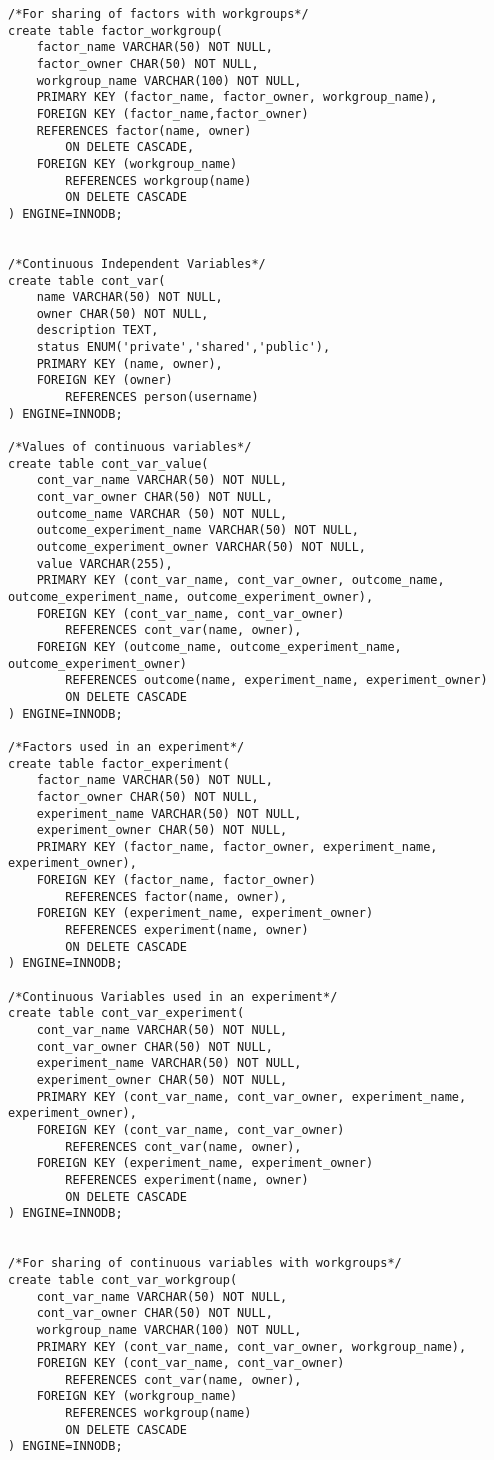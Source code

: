 \begin{tiny}
\begin{verbatim}
/*For sharing of factors with workgroups*/
create table factor_workgroup(
	factor_name VARCHAR(50) NOT NULL,
	factor_owner CHAR(50) NOT NULL,
	workgroup_name VARCHAR(100) NOT NULL,
	PRIMARY KEY (factor_name, factor_owner, workgroup_name),
	FOREIGN KEY (factor_name,factor_owner)
	REFERENCES factor(name, owner)
		ON DELETE CASCADE,
	FOREIGN KEY (workgroup_name)
		REFERENCES workgroup(name)
		ON DELETE CASCADE
) ENGINE=INNODB;	


/*Continuous Independent Variables*/
create table cont_var(
	name VARCHAR(50) NOT NULL,
	owner CHAR(50) NOT NULL,
	description TEXT,
	status ENUM('private','shared','public'),
	PRIMARY KEY (name, owner),
	FOREIGN KEY (owner)
		REFERENCES person(username)
) ENGINE=INNODB;

/*Values of continuous variables*/
create table cont_var_value(
	cont_var_name VARCHAR(50) NOT NULL,
	cont_var_owner CHAR(50) NOT NULL,
	outcome_name VARCHAR (50) NOT NULL,
	outcome_experiment_name VARCHAR(50) NOT NULL,
	outcome_experiment_owner VARCHAR(50) NOT NULL,
	value VARCHAR(255),
	PRIMARY KEY (cont_var_name, cont_var_owner, outcome_name, outcome_experiment_name, outcome_experiment_owner),
	FOREIGN KEY (cont_var_name, cont_var_owner)
		REFERENCES cont_var(name, owner),
	FOREIGN KEY (outcome_name, outcome_experiment_name, outcome_experiment_owner)
		REFERENCES outcome(name, experiment_name, experiment_owner)
		ON DELETE CASCADE
) ENGINE=INNODB;

/*Factors used in an experiment*/
create table factor_experiment(
	factor_name VARCHAR(50) NOT NULL,
	factor_owner CHAR(50) NOT NULL,
	experiment_name VARCHAR(50) NOT NULL,
	experiment_owner CHAR(50) NOT NULL,
	PRIMARY KEY (factor_name, factor_owner, experiment_name, experiment_owner),
	FOREIGN KEY (factor_name, factor_owner)
		REFERENCES factor(name, owner),
	FOREIGN KEY (experiment_name, experiment_owner)
		REFERENCES experiment(name, owner)
		ON DELETE CASCADE
) ENGINE=INNODB;

/*Continuous Variables used in an experiment*/
create table cont_var_experiment(
	cont_var_name VARCHAR(50) NOT NULL,
	cont_var_owner CHAR(50) NOT NULL,
	experiment_name VARCHAR(50) NOT NULL,
	experiment_owner CHAR(50) NOT NULL,
	PRIMARY KEY (cont_var_name, cont_var_owner, experiment_name, experiment_owner),
	FOREIGN KEY (cont_var_name, cont_var_owner)
		REFERENCES cont_var(name, owner),
	FOREIGN KEY (experiment_name, experiment_owner)
		REFERENCES experiment(name, owner)
		ON DELETE CASCADE
) ENGINE=INNODB;

	
/*For sharing of continuous variables with workgroups*/
create table cont_var_workgroup(
	cont_var_name VARCHAR(50) NOT NULL,
	cont_var_owner CHAR(50) NOT NULL,
	workgroup_name VARCHAR(100) NOT NULL,
	PRIMARY KEY (cont_var_name, cont_var_owner, workgroup_name),
	FOREIGN KEY (cont_var_name, cont_var_owner)
		REFERENCES cont_var(name, owner),
	FOREIGN KEY (workgroup_name) 
		REFERENCES workgroup(name)
		ON DELETE CASCADE  
) ENGINE=INNODB;	

\end{verbatim}
\end{tiny}